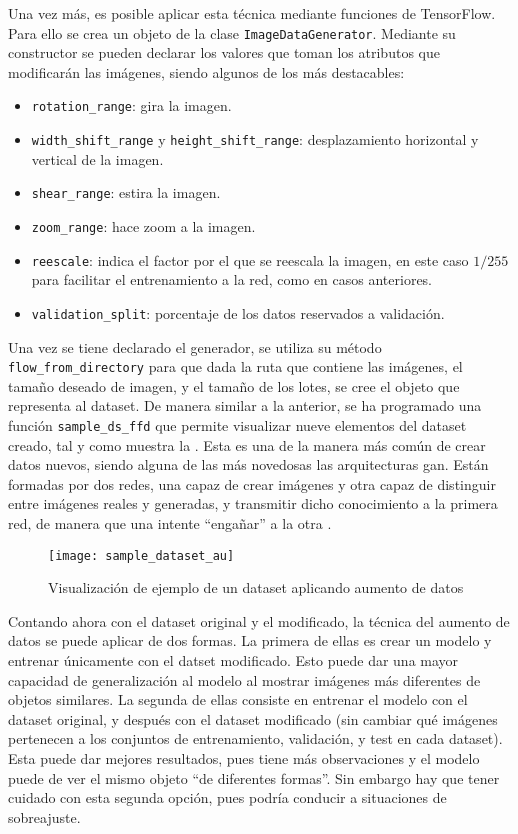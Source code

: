 			Una vez más, es posible aplicar esta técnica mediante funciones de TensorFlow. Para ello se crea un objeto de la clase \texttt{ImageDataGenerator}. Mediante su constructor se pueden declarar los valores que toman los atributos que modificarán las imágenes, siendo algunos de los más destacables: 
			
			\begin{itemize}
				\item \texttt{rotation\_range}: gira la imagen. 
				\item \texttt{width\_shift\_range} y \texttt{height\_shift\_range}: desplazamiento horizontal y vertical de la imagen. 
				\item \texttt{shear\_range}: estira la imagen. 
				\item \texttt{zoom\_range}: hace zoom a la imagen. 
				\item \texttt{reescale}: indica el factor por el que se reescala la imagen, en este caso $1/255$ para facilitar el entrenamiento a la red, como en casos anteriores. 
				\item \texttt{validation\_split}: porcentaje de los datos reservados a validación. 
			\end{itemize}
			
			Una vez se tiene declarado el generador, se utiliza su método \texttt{flow\_from\_directory} para que dada la ruta que contiene las imágenes, el tamaño deseado de imagen, y el tamaño de los lotes, se cree el objeto que representa al dataset. De manera similar a la anterior, se ha programado una función \texttt{sample\_ds\_ffd} que permite visualizar nueve elementos del dataset creado, tal y como muestra la . Esta es una de la manera más común de crear datos nuevos, siendo alguna de las más novedosas las arquitecturas \gls{gan}. Están formadas por dos redes, una capaz de crear imágenes y otra capaz de distinguir entre imágenes reales y generadas, y transmitir dicho conocimiento a la primera red, de manera que una intente ``engañar'' a la otra \cite{gan}. \\
			
			\begin{figure}
				\centering
				\texttt{[image: sample\_dataset\_au]}
				\caption{Visualización de ejemplo de un dataset aplicando aumento de datos}
				\label{fig:sample_dataset_au}
			\end{figure}
			
			Contando ahora con el dataset original y el modificado, la técnica del aumento de datos se puede aplicar de dos formas. La primera de ellas es crear un modelo y entrenar únicamente con el datset modificado. Esto puede dar una mayor capacidad de generalización al modelo al mostrar imágenes más diferentes de objetos similares. La segunda de ellas consiste en entrenar el modelo con el dataset original, y después con el dataset modificado (sin cambiar qué imágenes pertenecen a los conjuntos de entrenamiento, validación, y test en cada dataset). Esta puede dar mejores resultados, pues tiene más observaciones y el modelo puede de ver el mismo objeto ``de diferentes formas''. Sin embargo hay que tener cuidado con esta segunda opción, pues podría conducir a situaciones de sobreajuste. 
			
